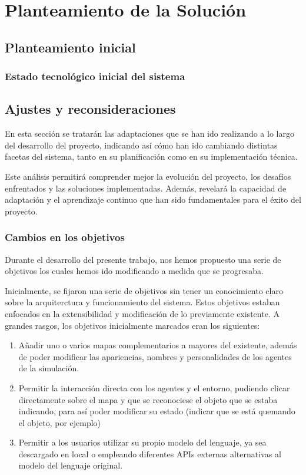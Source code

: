 \chapter{Planteamiento de la Solución}
\label{cap:planteamiento}
\section{Planteamiento inicial}

\subsection{Estado tecnológico inicial del sistema}

\section{Ajustes y reconsideraciones}

En esta sección se tratarán las adaptaciones que se han ido realizando a lo largo del desarrollo del proyecto, indicando así cómo han ido cambiando distintas facetas del sistema, tanto en su planificación como en su implementación técnica.

Este análisis permitirá comprender mejor la evolución del proyecto, los desafíos enfrentados y las soluciones implementadas. Además, revelará la capacidad de adaptación y el aprendizaje continuo que han sido fundamentales para el éxito del proyecto.

\subsection{Cambios en los objetivos}

Durante el desarrollo del presente trabajo, nos hemos propuesto una serie de objetivos los cuales hemos ido modificando a medida que se progresaba.

Inicialmente, se fijaron una serie de objetivos sin tener un conocimiento claro sobre la arquiterctura y funcionamiento del sistema. Estos objetivos estaban enfocados en la extensibilidad y modificación de lo previamente existente. A grandes rasgos, los objetivos inicialmente marcados eran los siguientes:

\begin{enumerate}
	\item Añadir uno o varios mapas complementarios a mayores del existente, además de poder modificar las apariencias, nombres y personalidades de los agentes de la simulación.
	
	\item Permitir la interacción directa con los agentes y el entorno, pudiendo clicar directamente sobre el mapa y que se reconociese el objeto que se estaba indicando, para así poder modificar su estado (indicar que se está quemando el objeto, por ejemplo)
	
	\item Permitir a los usuarios utilizar su propio modelo del lenguaje, ya sea descargado en local o empleando diferentes APIs externas alternativas al modelo del lenguaje original.
\end{enumerate}

